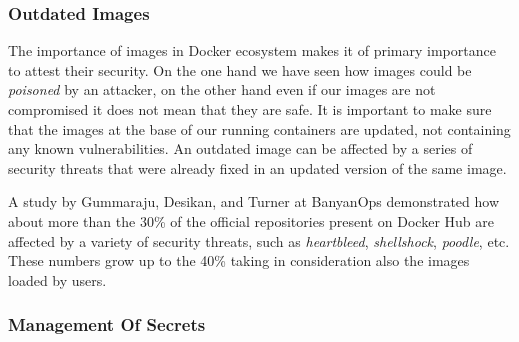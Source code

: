 \documentclass[a4paper,12pt]{article}
\begin{document}
\subsubsection{Outdated Images}

The importance of images in Docker ecosystem makes it of primary importance to
attest their security. On the one hand we have seen how images could be
\textit{poisoned} by an attacker, on the other hand even if our images are not
compromised it does not mean that they are safe. It is important to make sure
that the images at the base of our running containers are updated, not
containing any known vulnerabilities.  An outdated image can be affected by a
series of security threats that were already fixed in an updated version of the
same image. \par A study by Gummaraju, Desikan, and Turner at BanyanOps
\cite{gummaraju_desikan_turner} demonstrated how about more than the 30\% of the
official repositories present on Docker Hub are affected by a variety of
security threats, such as \textit{heartbleed}, \textit{shellshock},
\textit{poodle}, etc. These numbers grow up to the 40\% taking in consideration
also the images loaded by users. 

\subsubsection{Management Of Secrets}
\end{document}
